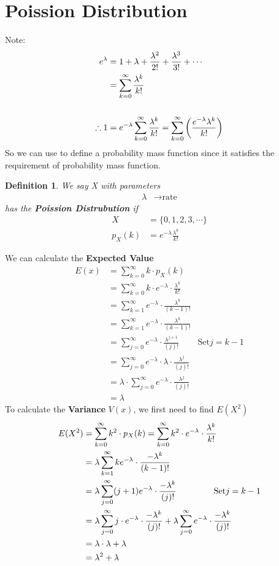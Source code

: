 \documentclass[11pt,oneside]{book}
\theoremstyle{break}
\theoremstyle{break}
\newtheorem{defn}{Definition}[corL]
\newcommand{\note}{\color{Purple}Note: \color{black}}
\begin{document}
\section[Poisson Distribution]{Poission Distribution}
\note \begin{align*}
e^{\lambda}&=1+\lambda+\frac{\lambda ^2}{2!}+\frac{\lambda^3}{3!}+\cdots\\
&=\sum_{k=0}^{\infty}\frac{\lambda^k}{k!}\\
\hfill\\
\therefore 1&=e^{-\lambda}\sum_{k=0}^{\infty}\frac{\lambda^k}{k!}=\sum_{k=0}^{\infty}\left( \frac{e^{-\lambda}\lambda^k}{k!}\right)
\end{align*}
So we can use to define a probability mass function since it satisfies the requirement of probability mass function.
\begin{defn}
We say X with parameters \begin{align*}
\lambda &\rightarrow \text{rate}
\end{align*}
has the \textbf{Poission Distrubution} if \begin{align*}
X&=\{0,1,2,3,\cdots\}\\
p_X(k)&=e^{-\lambda}\frac{\lambda^k}{k!}
\end{align*}
\end{defn}
We can calculate the \textbf{Expected Value}
\begin{align*}
E(x)&=\sum_{k=0}^{\infty}k\cdot p_X(k)\\
&=\sum_{k=0}^{\infty}k\cdot e^{-\lambda}\cdot \frac{\lambda^k}{k!}\\
&=\sum_{k=1}^{\infty} e^{-\lambda}\cdot \frac{\lambda^k}{(k-1)!}\\
&= \sum_{k=1}^{\infty} e^{-\lambda}\cdot \frac{\lambda^k}{(k-1)!}\\
& =\sum_{j=0}^{\infty} e^{-\lambda}\cdot \frac{\lambda^{j+1}}{(j)!}&\text{Set} j =k-1\\
&=\sum_{j=0}^{\infty} e^{-\lambda}\cdot \lambda\cdot \frac{\lambda^{j}}{(j)!}\\
&=\lambda\cdot \sum_{j=0}^{\infty} e^{-\lambda}\cdot \frac{\lambda^{j}}{(j)!}\\
&=\lambda
\end{align*}
To calculate the \textbf{Variance} $V(x)$, we first need to find $E(X^2)$\begin{align*}
E(X^2)&=\sum_{k=0}^{\infty}k^2\cdot p_X(k)
=\sum_{k=0}^{\infty} k^2 \cdot e^{-\lambda}\cdot \frac{\lambda^k}{k!}\\
&=\lambda\sum_{k=1}^{\infty}ke^{-\lambda}\cdot \frac{-\lambda^k}{(k-1)!}\\
&=\lambda\sum_{j=0}^{\infty}(j+1)e^{-\lambda}\cdot \frac{-\lambda^k}{(j)!}\text{ \qquad \qquad Set}j=k-1\\
&=\lambda \sum_{j=0}^{\infty} j\cdot e^{-\lambda}\cdot \frac{-\lambda^k}{(j)!}+\lambda \sum_{j=0}^{\infty}e^{-\lambda}\cdot \frac{-\lambda^k}{(j)!}\\
&=\lambda \cdot \lambda +\lambda\\
&=\lambda^2 +\lambda
\end{align*}
\end{document}
